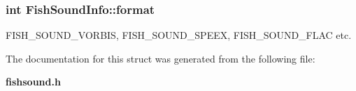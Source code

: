 \subsubsection[{format}]{\setlength{\rightskip}{0pt plus 5cm}int Fish\-Sound\-Info\-::format}\label{structFishSoundInfo_a3fd250e7150ce5eb58737f715264e913}


F\-I\-S\-H\-\_\-\-S\-O\-U\-N\-D\-\_\-\-V\-O\-R\-B\-I\-S, F\-I\-S\-H\-\_\-\-S\-O\-U\-N\-D\-\_\-\-S\-P\-E\-E\-X, F\-I\-S\-H\-\_\-\-S\-O\-U\-N\-D\-\_\-\-F\-L\-A\-C etc. 



The documentation for this struct was generated from the following file\-:\begin{DoxyCompactItemize}
\item 
{\bf fishsound.\-h}\end{DoxyCompactItemize}
